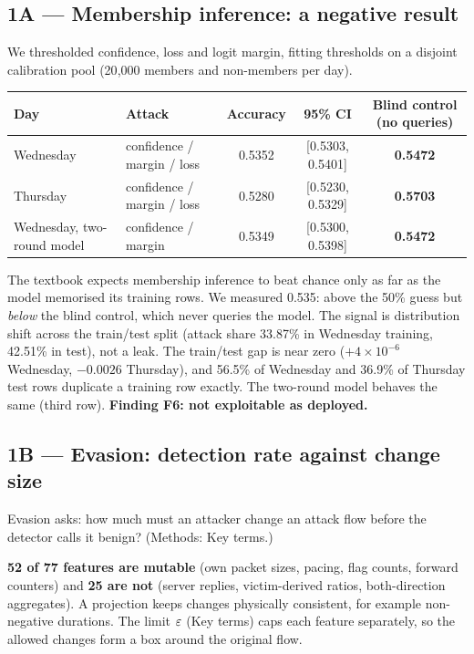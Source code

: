 \subsection{1A --- Membership inference: a negative result}

We thresholded confidence, loss and logit margin, fitting thresholds on a disjoint calibration pool (20{,}000 members and non-members per day).

\begin{center}\small
\begin{tabular}{@{}llccc@{}}
\toprule
\textbf{Day} & \textbf{Attack} & \textbf{Accuracy} & \textbf{95\% CI} & \textbf{Blind control (no queries)} \\
\midrule
Wednesday & confidence / margin / loss & 0.5352 & [0.5303, 0.5401] & \textbf{0.5472} \\
Thursday  & confidence / margin / loss & 0.5280 & [0.5230, 0.5329] & \textbf{0.5703} \\
Wednesday, two-round model & confidence / margin & 0.5349 & [0.5300, 0.5398] & \textbf{0.5472} \\
\bottomrule
\end{tabular}
\end{center}

 The textbook expects membership inference to beat chance only as far as the model memorised its training rows. We measured 0.535: above the 50\% guess but \emph{below} the blind control, which never queries the model. The signal is distribution shift across the train/test split (attack share 33.87\% in Wednesday training, 42.51\% in test), not a leak. The train/test gap is near zero ($+4\times10^{-6}$ Wednesday, $-0.0026$ Thursday), and 56.5\% of Wednesday and 36.9\% of Thursday test rows duplicate a training row exactly. The two-round model behaves the same (third row). \textbf{Finding F6: not exploitable as deployed.}

\subsection{1B --- Evasion: detection rate against change size}

Evasion asks: how much must an attacker change an attack flow before the detector calls it benign? (Methods: Key terms.)

 \textbf{52 of 77 features are mutable} (own packet sizes, pacing, flag counts, forward counters) and \textbf{25 are not} (server replies, victim-derived ratios, both-direction aggregates). A projection keeps changes physically consistent, for example non-negative durations. The limit $\varepsilon$ (Key terms) caps each feature separately, so the allowed changes form a box around the original flow.

